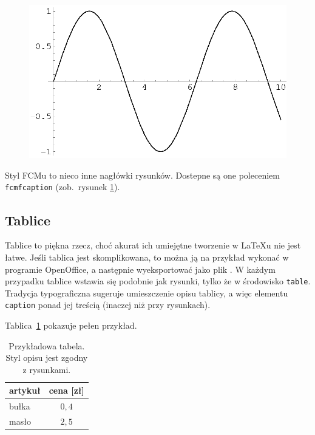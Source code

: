 \begin{figure}[t]
\centering\includegraphics[width=\textwidth]{figures/mathematica}
\label{rys:plama2}
\end{figure}

Styl FCMu to nieco inne nagłówki rysunków. Dostepne są one poleceniem \texttt{fcmfcaption} (zob.~rysunek
\ref{rys:plama2}).

\subsection{Tablice}

Tablice to piękna rzecz, choć akurat ich umiejętne tworzenie w \LaTeX{}u nie jest łatwe. 
Jeśli tablica jest skomplikowana, to można ją na przykład wykonać w programie
OpenOffice, a następnie wyeksportować jako plik . W każdym przypadku tablice wstawia się podobnie
jak rysunki, tylko że w środowisko \texttt{table}. Tradycja typograficzna sugeruje umieszczenie opisu tablicy, a więc
elementu \texttt{caption} ponad jej treścią (inaczej niż przy rysunkach).  

Tablica~\ref{tab:tabela} pokazuje pełen przykład.

\begin{table}[ht]
\caption{Przykładowa tabela. Styl opisu jest zgodny z rysunkami.}\label{tab:tabela}
\centering\footnotesize%
\begin{tabular}{l c}
\toprule
artykuł & cena [zł] \\
\midrule
bułka   & $0,4$ \\
masło   & $2,5$ \\
\bottomrule
\end{tabular}
\end{table}

